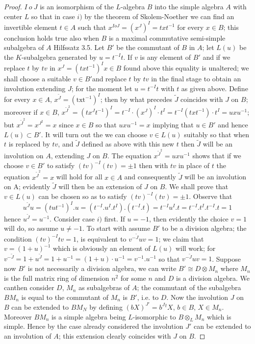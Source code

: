 \begin{proof}
$I~ o~ J$ is an isomorphism of the $L$-algebra $B$ into the simple
  algebra $A$ with center $L$ so that in case $i)$ by the theorem of
  Skolem-Noether we can find an invertible element $t \in A$ such that
  $x^{IoJ} = (x^J)^I = txt^{-1}$ for every $x \in B$; this conclusion
  holds true also when $B$ is a maximal commutative semi-simple
  subalgebra of $A$ \cite{keyK1} Hilfssatz 3.5. Let
  $B'$ be the commutant 
  of $B$ in $A$; let $L(u)$ be the $K$-subalgebra generated  by $u =
  t^{-I} t$. If $v$ is any element of $B'$ and if we replace $t$ by
  $tv$ in $x^J = (txt^{-1})^I x \in B$ found above this equality is
  unaltered; we shall choose a suitable $v \in B'$\pageoriginale and
  replace $t$ by 
  $tv$ in the final stage to obtain an involution extending $J$; for
  the moment let $u= t^{-I}t$ with $t$ as given above. Define for
  every $x \in A$, $x^{\widetilde{J}} = (\text{txt} ^{-1})^I $;  then
  by what precedes ${\widetilde{J}}$ coincides with $J$ on $B$;
  moreover if $x \in B$, $x^{{\widetilde{J}}^2}= (tx^Jt^{-1})^I =
  t^{-I} \cdot (x^J)^I \cdot t^I = t^{-I} (txt^{-1}) \cdot t^I =  
  uxu^{-1}$; but $x^{{\widetilde{J}}^2} = x^{J^{2}}= x$ since $x \in
  B$ so that $uxu^{-1}=x$ implying that $u \in B'$ and hence
  $L(u)\subset B'$. It 
  will turn  out the we can choose $v \in L(u)$ suitably so that when
  $t$ is replaced by $tv$, and $\widetilde{J}$ defined as
  above  with this new $t$  then $\widetilde{J}$  will be an
  involution on $A$, extending $J$ on $B$. The equation $x^{\widetilde{J}^2}
  = uxu^{-1}$ shows that if we choose $v \in B'$ to satisfy
  $(tv)^{-I}(tv)=\pm 1$ then with $tv$ in place of $t$ the equation
  $x^{\widetilde{J}^2}=x$ will hold for all $x \in A$ and consequently
  $\widetilde{J}$ will be an involution on A; evidently
  $\widetilde{J}$ will then 
  be an extension of $J$ on $B$. We shall prove that $ v \in L(u)$ can
  be chosen so as to satisfy $(tv)^{-I}(tv) = \pm 1$. Observe that  
$$
u^{\widetilde{J}}u = (tut^{-1})^I. u =(t^{-I}. u^I . t^I). (t^{-I}.t)
= t^{-I}u^I.t  =t^{-I}.t^I.t^{-I}.t =1
$$
hence $u^{\widetilde{J}}=u^{-1}$. Consider case $i)$ first. If $u=-1$,
then  evidently the 
choice $v =1$ will do, so assume $u \neq -1$. To start with assume
$B'$ to be a division algebra; the condition $(tv)^{-I}tv =1$, is
equivalent to $v^{-\widetilde{J}} u v =1$; we claim that
$v=(1+u)^{-1}$ which is obviously an element of $L(u)$ will work; for
$v^{-\widetilde{J}}=1+u^{\widetilde{J}} = 1+u^{-1}= (1+u) \cdot u^{-1}
= v^{-1}.u^{-1}$ so
that $v^{-\widetilde{J}}  uv =1$. Suppose now $B'$ is not
necessarily a division algebra, we can write $B' \cong D
\otimes M_n$ where $M_n$ is the full matrix ring of dimension $n^2$
for some $n$ 
and $D$ is a division algebra. We can\pageoriginale then consider $D$,
$M_n$ as 
subalgebras of $A$; the commutant of the subalgebra $BM_n$ is equal
to the commutant of $M_n$ is $B'$, i.e. to $D$. Now the involution $J$
on $B$ can be extended to $BM_N$ by defining $(bX)^{J'} = b^J {}^t X$, $b
\in B$, $X \in M_n$. Moreover $BM_n$ is a simple algebra being
$L$-isomorphic to $B \otimes_L M_n$ which is simple. Hence by the case
already considered the involution $J'$ can be extended to an
involution of $A$; this extension clearly coincides with $J$ on $B$. 


\end{proof}

